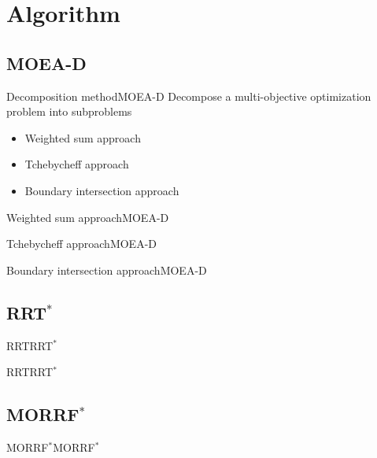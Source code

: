 \section{Algorithm}

\subsection{MOEA-D}

\begin{frame}{Decomposition method}{MOEA-D}
Decompose a multi-objective optimization problem into subproblems
\begin{itemize}
	\item Weighted sum approach
	\item Tchebycheff approach
	\item Boundary intersection approach
\end{itemize}
\end{frame}

\begin{frame}{Weighted sum approach}{MOEA-D}
	
\end{frame}

\begin{frame}{Tchebycheff approach}{MOEA-D}
	
\end{frame}

\begin{frame}{Boundary intersection approach}{MOEA-D}
	
\end{frame}

\subsection{RRT$^{*}$}

\begin{frame}{RRT}{RRT$^{*}$}
	
\end{frame}

\begin{frame}{RRT}{RRT$^{*}$}
	
\end{frame}

\subsection{MORRF$^{*}$}

\begin{frame}{MORRF$^{*}$}{MORRF$^{*}$}
	
\end{frame}